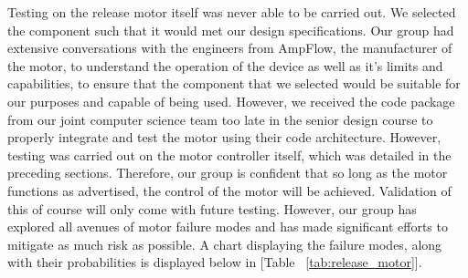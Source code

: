 \indent\indent Testing on the release motor itself was never able to be carried out. We selected the component such that it would met our design specifications. Our group had extensive conversations with the engineers from AmpFlow, the manufacturer of the motor, to understand the operation of the device as well as it's limits and capabilities, to ensure that the component that we selected would be suitable for our purposes and capable of being used. However, we received the code package from our joint computer science team too late in the senior design course to properly integrate and test the motor using their code architecture. However, testing was carried out on the motor controller itself, which was detailed in the preceding sections. Therefore, our group is confident that so long as the motor functions as advertised, the control of the motor will be achieved. Validation of this of course will only come with future testing. However, our group has explored all avenues of motor failure modes and has made significant efforts to mitigate as much risk as possible. A chart displaying the failure modes, along with their probabilities is displayed below in [Table ~\ref{tab:release_motor}]. 

\begin{table}[H]
\caption{\label{tab:release_motor} Release Motor Failure Modes \& Probabilities}
\centering

\end{table}

